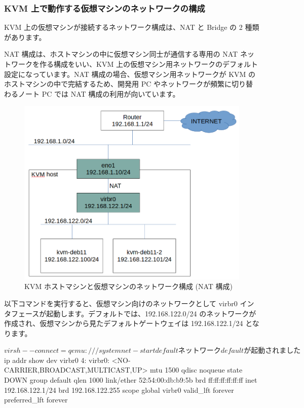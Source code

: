 \documentclass[mingoth,a4paper]{jsarticle}
\begin{document}
\subsubsection{KVM 上で動作する仮想マシンのネットワークの構成}

KVM 上の仮想マシンが接続するネットワーク構成は、NAT と Bridge の 2 種類があります。


NAT 構成は、ホストマシンの中に仮想マシン同士が通信する専用の NAT ネットワークを作る構成をいい、KVM 上の仮想マシン用ネットワークのデフォルト設定になっています。NAT 構成の場合、仮想マシン用ネットワークが KVM のホストマシンの中で完結するため、開発用 PC やネットワークが頻繁に切り替わるノート PC では NAT 構成の利用が向いています。

\begin{figure}[h]
  \centering
  \includegraphics[scale=0.3]{image202210/kvm-network_nat.png}
  \caption{KVM ホストマシンと仮想マシンのネットワーク構成 (NAT 構成)}
  \label{fig:kvm-network_nat}
\end{figure}

以下コマンドを実行すると、仮想マシン向けのネットワークとして virbr0 インタフェースが起動します。デフォルトでは、192.168.122.0/24 のネットワークが作成され、仮想マシンから見たデフォルトゲートウェイは 192.168.122.1/24 となります。

\begin{commandline}
$ virsh --connect=qemu:///system net-start default
ネットワーク default が起動されました

$ ip addr show dev virbr0
4: virbr0: <NO-CARRIER,BROADCAST,MULTICAST,UP> mtu 1500 qdisc noqueue state DOWN group default qlen 1000
    link/ether 52:54:00:db:b9:5b brd ff:ff:ff:ff:ff:ff
    inet 192.168.122.1/24 brd 192.168.122.255 scope global virbr0
       valid_lft forever preferred_lft forever
\end{commandline}
\end{document}
